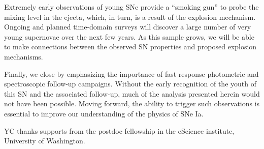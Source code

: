 \documentclass[twocolumn]{aastex61}
\begin{document}
Extremely early observations of young SNe provide a ``smoking
gun'' to probe the mixing level in the ejecta, which, in turn, is 
a result of the explosion mechanism. Ongoing and planned
time-domain surveys will discover a large number of very young supernovae over the next few years. As this sample grows, we will
be able to make connections between the observed SN properties and 
proposed explosion mechanisms.

Finally, we close by emphasizing the importance of fast-response photometric and spectroscopic follow-up campaigns. Without the early recognition of the youth of this SN and the associated follow-up, much of the analysis presented herein would not have been possible. Moving forward, the ability to trigger such observations is essential to improve our understanding of the physics of SNe Ia.

\acknowledgements

YC thanks supports from the postdoc fellowship in the eScience
institute, University of Washington.



\end{document}
